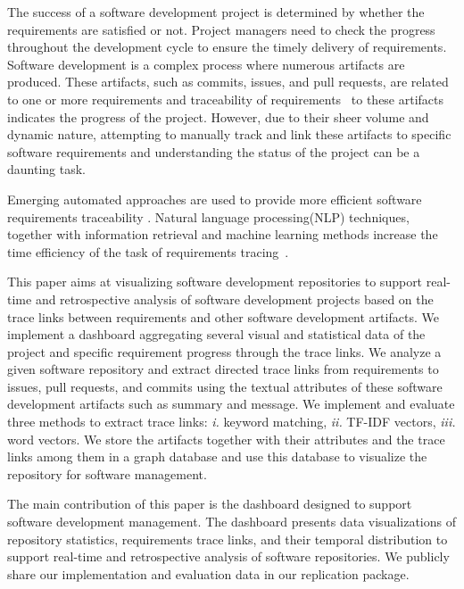 %
The success of a software development project is determined by whether the requirements are satisfied or not. Project managers need to check the progress throughout the development cycle to ensure the timely delivery of requirements. Software development is a complex process where numerous artifacts are produced. These artifacts, such as commits, issues, and pull requests, are related to one or more requirements and traceability of requirements~\cite{gotel-1994} to these artifacts indicates the progress of the project. However, due to their sheer volume and dynamic nature, attempting to manually track and link these artifacts to specific software requirements and understanding the status of the project can be a daunting task.

%
Emerging automated approaches are used to provide more efficient software requirements traceability \cite{cleland-huang-2007,mills-2017,VANOOSTEN2023107226,bonner-2023,deen-2023}. Natural language processing(NLP) techniques, together with information retrieval and machine learning methods increase the time efficiency of the task of requirements tracing~\cite{cleland-huang-2007}.

%
This paper aims at visualizing software development repositories to support real-time and retrospective analysis of software development projects based on the trace links between requirements and other software development artifacts. We implement a dashboard aggregating several visual and statistical data of the project and specific requirement progress through the trace links. We analyze a given software repository and extract directed trace links from requirements to issues, pull requests, and commits using the textual attributes of these software development artifacts such as summary and message. We implement and evaluate three methods to extract trace links: \emph{i.} keyword matching, \emph{ii.} TF-IDF vectors, \emph{iii.} word vectors. We store the artifacts together with their attributes and the trace links among them in a graph database and use this database to visualize the repository for software management.

The main contribution of this paper is the dashboard designed to support software development management. The dashboard presents data visualizations of repository statistics, requirements trace links, and their temporal distribution to support real-time and retrospective analysis of software repositories. We publicly share our implementation and evaluation data in our replication package.















